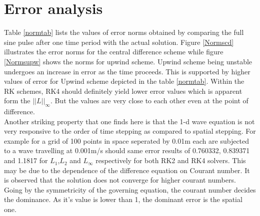 \documentclass[a4paper,12pt]{report}
\begin{document}
\section{Error analysis}
Table \ref{normtab} lists the values of error norms obtained by comparing the full sine pulse after one time period with the actual solution. Figure \ref{Normscd} illustrates the error norms for the central difference scheme while figure \ref{Normsupw} shows the norms for upwind scheme. Upwind scheme being unstable undergoes an increase in error as the time proceeds. This is supported by higher values of error for Upwind scheme depicted in the table \ref{normtab}. Within the RK schemes, RK4 should definitely yield lower error values which is apparent form the $||L||_{\infty}$. But the values are very close to each other even at the point of difference.\\
Another striking property that one finds here is that the 1-d wave equation is not very responsive to the order of time stepping as compared to spatial stepping. For example for a grid of 100 points in space seperated by 0.01m each are subjected to a wave travelling at 0.001m/s should same error results of 0.760332, 0.839371 and 1.1817 for $L_1$,$L_2$ and $L_{\infty}$ respectively for both RK2 and RK4 solvers. This may be due to the dependence of the difference equation on Courant number. It is observed that the solution does not converge for higher courant numbers. Going by the symmetricity of the governing equation, the courant number decides the dominance. As it's value is lower than 1, the dominant error is the spatial one. 
\end{document}
